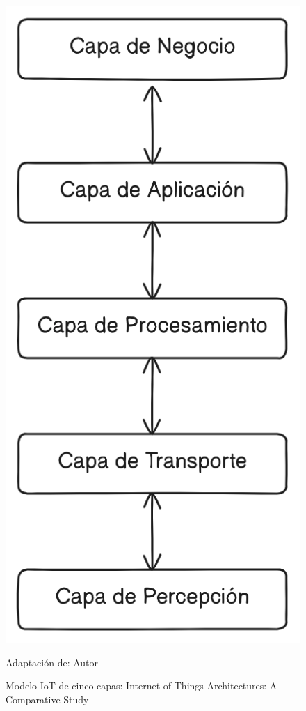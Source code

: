 \documentclass[stu,12pt,floatsintext]{apa7}
\begin{document}
		\begin{figure}[H]
		\centering
		\includegraphics[scale=0.3]{iot_modelo_5_capas}
		\captionsetup{justification=centering}
		\caption{Modelo IoT de cinco capas: Internet of Things Architectures: A Comparative Study}
		\small
		\label{iot_cinco_capas}
		Adaptación de: Autor
	\end{figure}
	
\end{document}
